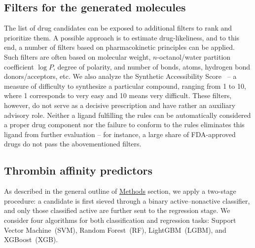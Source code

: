 \documentclass[12pt]{article}
\begin{document}
\subsection*{\sffamily \large Filters for the generated molecules}

The list of drug candidates can be exposed to additional filters to rank and prioritize them.
A possible approach is to estimate drug-likeliness, and to this end, a number of filters based on pharmacokinetic principles can be applied.~\cite{Pathania2021,Kralj2022}
Such filters are often based on molecular weight, $n$-octanol/water partition coefficient $\log P$, degree of polarity, and number of bonds, atoms, hydrogen bond donors/acceptors, etc.
We also analyze the Synthetic Accessibility Score~\cite{Ertl2009,Daina2017} -- a measure of difficulty to synthesize a particular compound, ranging from 1 to 10, where 1 corresponds to very easy and 10 means very difficult.
These filters, however, do not serve as a decisive prescription and have rather an auxiliary advisory role.
Neither a ligand fulfilling the rules can be automatically considered a proper drug component nor the failure to conform to the rules eliminates this ligand from further evaluation --
for instance, a large share of FDA-approved drugs do not pass the abovementioned filters.~\cite{OHagan2015,Kralj2022}



\subsection*{\sffamily \large Thrombin affinity predictors}

As described in the general outline of \hyperref[sec:Methods]{Methods} section, we apply a two-stage procedure: a candidate is first sieved through a binary active--nonactive classifier, and only those classified active are further sent to the regression stage.
We consider four algorithms for both classification and regression tasks:
Support Vector Machine~(SVM),\cite{Cortes1995} Random Forest~(RF),\cite{Breiman2001} LightGBM~(LGBM),\cite{Ke2017} and XGBoost~(XGB).\cite{Chen2016}
\end{document}
